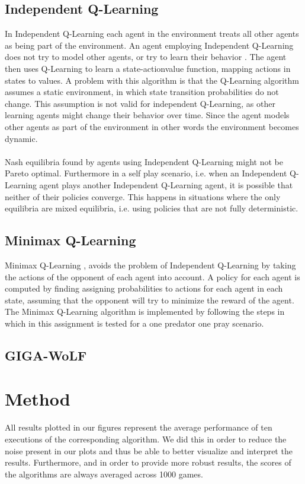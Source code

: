 \documentclass[a4paper,12pt]{article}
\begin{document}
\subsection{Independent Q-Learning}
In Independent Q-Learning each agent in the environment treats all other agents as being part of the environment. An agent employing Independent Q-Learning does not try to model other agents, or try to learn their behavior \cite{vlasis}. The agent then uses Q-Learning to learn a state-actionvalue function, mapping actions in states to values.
A problem with this algorithm is that the Q-Learning algorithm \cite{SB} assumes a static environment, in which state transition probabilities do not change. This assumption is not valid for independent Q-Learning, as other learning agents might change their behavior over time. Since the agent models other agents as part of the environment in other words the environment becomes dynamic.
\\ \\
Nash equilibria found by agents using Independent Q-Learning might not be Pareto optimal. Furthermore in a self play scenario, i.e. when an Independent Q-Learning agent plays another Independent Q-Learning agent, it is possible that neither of their policies converge. This happens in situations where the only equilibria are mixed equilibria, i.e. using policies that are not fully deterministic.

\subsection{Minimax Q-Learning}
Minimax Q-Learning \cite{minimax}, avoids the problem of Independent Q-Learning by taking the actions of the opponent of each agent into account. A policy for each agent is computed by finding assigning probabilities to actions for each agent in each state, assuming that the opponent will try to minimize the reward of the agent. 
The Minimax Q-Learning algorithm is implemented by following the steps in \cite{hk} which in this assignment is tested for a one predator one pray scenario.
\subsection{GIGA-WoLF}
\section{Method}

All results plotted in our figures represent the average performance of ten executions of the corresponding algorithm. We did this in order to reduce the noise present in our plots and thus be able to better visualize and interpret the results. Furthermore, and in order to provide more robust results, the scores of the algorithms are always averaged across 1000 games.
\end{document}
